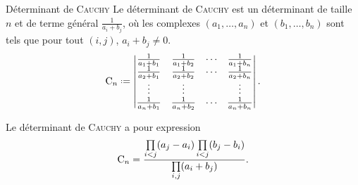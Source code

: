 \begin{defi}{Déterminant de \textsc{Cauchy}}
    Le déterminant de \textsc{Cauchy} est un déterminant de taille $n$ et de terme général $\frac{1}{a_i+b_j}$, où les complexes $(a_1, \dots, a_n)$ et $(b_1, \dots, b_n)$ sont tels que pour tout $(i, j)$, $a_i+b_j \not= 0$.
    $$\Cauchy_n \defeq \begin{vmatrix}
        \frac{1}{a_1+b_1} & \frac{1}{a_1+b_2} & \cdots & \frac{1}{a_1+b_n} \\
        \frac{1}{a_2+b_1} & \frac{1}{a_2+b_2} & \cdots & \frac{1}{a_2+b_n} \\
        \vdots & \vdots & & \vdots \\
        \frac{1}{a_n+b_1} & \frac{1}{a_n+b_2} & \cdots & \frac{1}{a_n+b_n}
    \end{vmatrix}.$$
\end{defi}

\begin{prop}{}
    Le déterminant de \textsc{Cauchy} a pour expression
    $$\mathrm{C}_n = \frac{\prod\limits_{i<j}(a_j-a_i) \prod\limits_{i<j}(b_j-b_i)}{\prod\limits_{i,j}(a_i+b_j)}.$$
\end{prop}
        
